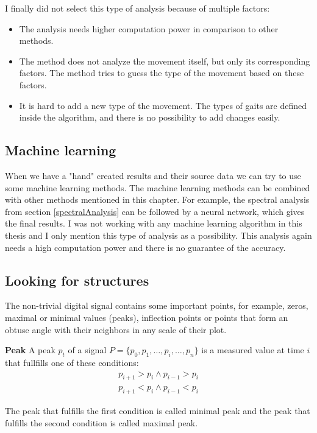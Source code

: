 I finally did not select this type of analysis because of multiple factors:
\begin{itemize}
    \item The analysis needs higher computation power in comparison to other methods.
    \item The method does not analyze the movement itself, but only its corresponding factors. The method tries to guess the type of the movement based on these factors.
    \item It is hard to add a new type of the movement. The types of gaits are defined inside the algorithm, and there is no possibility to add changes easily.
\end{itemize}

\subsection{Machine learning}
When we have a "hand" created results and their source data we can try to use some machine learning methods. The machine learning methods can be combined with other methods mentioned in this chapter. For example, the spectral analysis from section \ref{spectralAnalysis} can be followed by a neural network, which gives the final results. I was not working with any machine learning algorithm in this thesis and I only mention this type of analysis as a possibility. This analysis again needs a high computation power and there is no guarantee of the accuracy.

\subsection{Looking for structures}
\label{signalLabelling}
The non-trivial digital signal contains some important points, for example, zeros, maximal or minimal values (peaks), inflection points or points that form an obtuse angle with their neighbors in any scale of their plot.

\begin{definition}{\textbf{Peak}}
    A peak $p_t$ of a signal $P = \{p_0, p_1, \dots, p_i, \dots, p_n\}$ is a measured value at time $i$ that fullfills one of these conditions:
    \begin{eqnarray}
    p_{i+1} > p_i \land p_{i-1} > p_i \\
    p_{i+1} < p_i \land p_{i-1} < p_i
    \end{eqnarray}
    
    The peak that fulfills the first condition is called minimal peak and the peak that fulfills the second condition is called maximal peak.
\end{definition}

